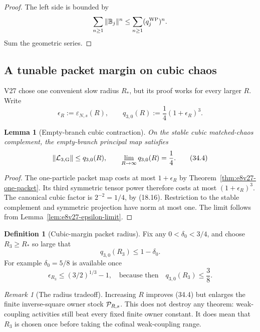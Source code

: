 \documentclass[11pt,oneside]{book}
\newtheorem{lemma}[theorem]{Lemma}
\theoremstyle{definition}
\newtheorem{definition}[theorem]{Definition}
\theoremstyle{remark}
\newtheorem{remark}[theorem]{Remark}
\begin{document}
\begin{proof}
The left side is bounded by
\[
 \sum_{n\geq1}\|{\mathbb B}_j\|^n
 \leq\sum_{n\geq1}(q_j^{\rm WP})^n.
\]
Sum the geometric series.
\end{proof}

\subsection{A tunable packet margin on cubic chaos}

V27 chose one convenient slow radius \(R_*\), but its proof works for
every larger \(R\).  Write
\[
 \epsilon_R:=\varepsilon_{N,s}(R),\qquad
 q_{3,0}(R):=\frac14(1+\epsilon_R)^3.                            \tag{34.3}
\]

\begin{lemma}[Empty-branch cubic contraction]
\label{lem:e8v34-empty-cubic}
On the stable cubic matched-chaos complement, the empty-branch
principal map satisfies
\[
 \|{\cal L}_{3,{\rm G}}\|\leq q_{3,0}(R),\qquad
                  \lim_{R\to\infty}q_{3,0}(R)=\frac14.           \tag{34.4}
\]
\end{lemma}

\begin{proof}
The one-particle packet map costs at most \(1+\epsilon_R\) by
Theorem~\ref{thm:e8v27-one-packet}.  Its third symmetric tensor power
therefore costs at most \((1+\epsilon_R)^3\).  The canonical cubic
factor is \(2^{-2}=1/4\), by (18.16).  Restriction to the stable
complement and symmetric projection have norm at most one.
The limit follows from
Lemma~\ref{lem:e8v27-epsilon-limit}.
\end{proof}

\begin{definition}[Cubic-margin packet radius]
\label{def:e8v34-R3}
Fix any \(0<\delta_0<3/4\), and choose \(R_3\geq R_*\) so large that
\[
                     q_{3,0}(R_3)\leq1-\delta_0.                 \tag{34.5}
\]
For example \(\delta_0=5/8\) is available once
\[
 \epsilon_{R_3}\leq(3/2)^{1/3}-1,
\quad\text{because then}\quad q_{3,0}(R_3)\leq\frac38.           \tag{34.6}
\]
\end{definition}

\begin{remark}[The radius tradeoff]
\label{rem:e8v34-radius-tradeoff}
Increasing \(R\) improves (34.4) but enlarges the finite inverse-square
owner stock \({\cal P}_{R,s}\).  This does not destroy any theorem:
weak-coupling activities still beat every fixed finite owner
constant.  It does mean that \(R_3\) is chosen once before taking the
cofinal weak-coupling range.
\end{remark}
\end{document}
